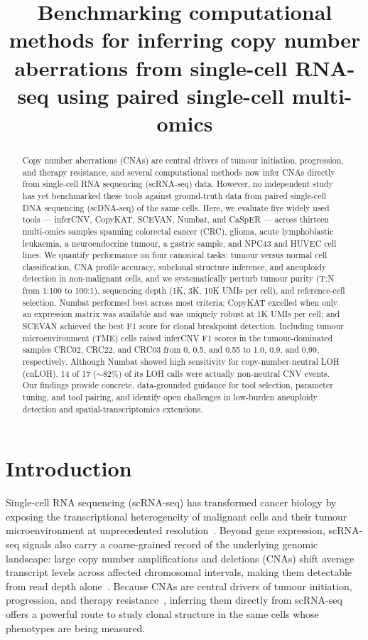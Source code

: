 \documentclass[11pt]{article}
\title{Benchmarking computational methods for inferring copy number
aberrations from single-cell RNA-seq using paired single-cell multi-omics}
\author{}
\date{}
\begin{document}
\maketitle

\begin{abstract}
Copy number aberrations (CNAs) are central drivers of tumour initiation,
progression, and therapy resistance, and several computational methods now
infer CNAs directly from single-cell RNA sequencing (scRNA-seq) data.
However, no independent study has yet benchmarked these tools against
ground-truth data from paired single-cell DNA sequencing (scDNA-seq) of the
same cells. Here, we evaluate five widely used tools --- inferCNV, CopyKAT,
SCEVAN, Numbat, and CaSpER --- across thirteen multi-omics samples spanning
colorectal cancer (CRC), glioma, acute lymphoblastic leukaemia, a
neuroendocrine tumour, a gastric sample, and NPC43 and HUVEC cell lines. We
quantify performance on four canonical tasks: tumour versus normal cell
classification, CNA profile accuracy, subclonal structure inference, and
aneuploidy detection in non-malignant cells, and we systematically perturb
tumour purity (T:N from 1:100 to 100:1), sequencing depth (1K, 3K, 10K UMIs
per cell), and reference-cell selection. Numbat performed best across most
criteria; CopyKAT excelled when only an expression matrix was available and
was uniquely robust at 1K UMIs per cell; and SCEVAN achieved the best F1 score
for clonal breakpoint detection. Including tumour microenvironment (TME) cells
raised inferCNV F1 scores in the tumour-dominated samples CRC02, CRC22, and
CRC03 from 0, 0.5, and 0.55 to 1.0, 0.9, and 0.99, respectively. Although
Numbat showed high sensitivity for copy-number-neutral LOH (cnLOH), 14 of 17
($\sim$82\%) of its LOH calls were actually non-neutral CNV events. Our
findings provide concrete, data-grounded guidance for tool selection,
parameter tuning, and tool pairing, and identify open challenges in low-burden
aneuploidy detection and spatial-transcriptomics extensions.
\end{abstract}

\section{Introduction}

Single-cell RNA sequencing (scRNA-seq) has transformed cancer biology by
exposing the transcriptional heterogeneity of malignant cells and their
tumour microenvironment at unprecedented resolution~\cite{tang2009mrnaseq,
patel2014single,tirosh2016dissecting}. Beyond gene expression, scRNA-seq
signals also carry a coarse-grained record of the underlying genomic
landscape: large copy number amplifications and deletions (CNAs) shift
average transcript levels across affected chromosomal intervals, making
them detectable from read depth alone~\cite{patel2014single,
beroukhim2010landscape}. Because CNAs are central drivers of tumour
initiation, progression, and therapy resistance~\cite{beroukhim2010landscape,
stephens2011chromothripsis,mcgranahan2017clonal}, inferring them directly
from scRNA-seq offers a powerful route to study clonal structure in the
same cells whose phenotypes are being measured.
\end{document}
